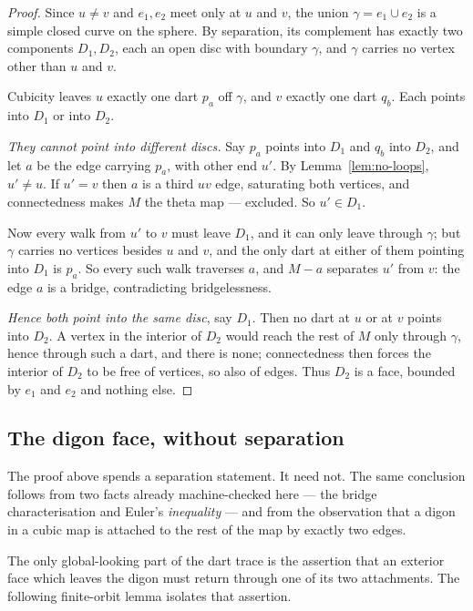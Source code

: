 \begin{proof}
Since $u \neq v$ and $e_1,e_2$ meet only at $u$ and $v$, the union
$\gamma = e_1 \cup e_2$ is a simple closed curve on the sphere. By
separation, its complement has exactly two components $D_1, D_2$, each an
open disc with boundary $\gamma$, and $\gamma$ carries no vertex other than
$u$ and $v$.

Cubicity leaves $u$ exactly one dart $p_a$ off $\gamma$, and $v$ exactly one
dart $q_b$. Each points into $D_1$ or into $D_2$.

\emph{They cannot point into different discs.} Say $p_a$ points into $D_1$
and $q_b$ into $D_2$, and let $a$ be the edge carrying $p_a$, with other end
$u'$. By Lemma~\ref{lem:no-loops}, $u' \neq u$. If $u' = v$ then $a$ is a
third $uv$ edge, saturating both vertices, and connectedness makes $M$ the
theta map --- excluded. So $u' \in D_1$.

Now every walk from $u'$ to $v$ must leave $D_1$, and it can only leave
through $\gamma$; but $\gamma$ carries no vertices besides $u$ and $v$, and
the only dart at either of them pointing into $D_1$ is $p_a$. So every such
walk traverses $a$, and $M - a$ separates $u'$ from $v$: the edge $a$ is a
bridge, contradicting bridgelessness.

\emph{Hence both point into the same disc}, say $D_1$. Then no dart at $u$
or at $v$ points into $D_2$. A vertex in the interior of $D_2$ would reach
the rest of $M$ only through $\gamma$, hence through such a dart, and there
is none; connectedness then forces the interior of $D_2$ to be free of
vertices, so also of edges. Thus $D_2$ is a face, bounded by $e_1$ and $e_2$
and nothing else.
\end{proof}

\subsection{The digon face, without separation}

The proof above spends a separation statement. It need not. The same
conclusion follows from two facts already machine-checked here --- the
bridge characterisation and Euler's \emph{inequality} --- and from the
observation that a digon in a cubic map is attached to the rest of the map
by exactly two edges.

The only global-looking part of the dart trace is the assertion that an
exterior face which leaves the digon must return through one of its two
attachments.  The following finite-orbit lemma isolates that assertion.

